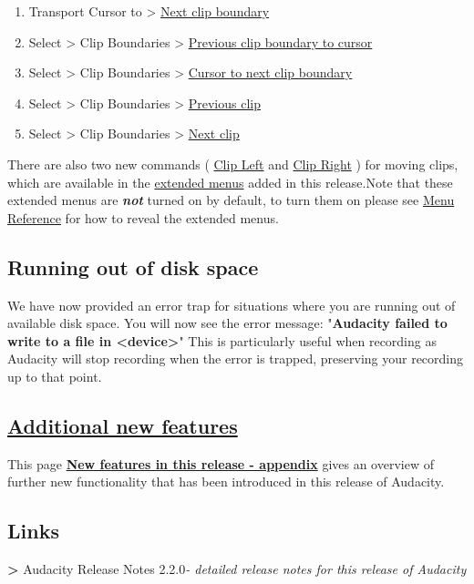 \begin{multicols}{2}
\begin{enumerate}
\item Transport Cursor to > 
\hyperref[\foo{transport:menu:cursor:to:next:clip:boundary}]{Next clip boundary}

\item Select > Clip Boundaries > 
\hyperref[\foo{select:menu:clip:boundaries:previous:clip:boundary:to:cursor}]{Previous clip boundary to cursor}

\item Select > Clip Boundaries > 
\hyperref[\foo{select:menu:clip:boundaries:cursor:to:next:clip:boundary}]{Cursor to next clip boundary}

\item Select > Clip Boundaries > 
\hyperref[\foo{select:menu:clip:boundaries:previous:clip}]{Previous clip}

\item Select > Clip Boundaries > 
\hyperref[\foo{select:menu:clip:boundaries:next:clip}]{Next clip}

\end{enumerate}
There are also two new commands (
\hyperref[\foo{ext:command:menu:cursor:clip:left}]{Clip Left}
 and 
\hyperref[\foo{ext:command:menu:cursor:clip:right}]{Clip Right}
) for moving clips, which are available in the 
\hyperref[\foo{new:features:in:this:release::extendedmenubar}]{extended menus}
 added in this release.Note that these extended menus are \textit{\textbf{not}} turned on by default, to turn them on please see 
\hyperref[\foo{menu:reference:the:extended:menu:bar}]{Menu Reference}
 for how to reveal the extended menus.
\subsection{Running out of disk space}
\label{new:features:in:this:release:safety}We have now provided an error trap for situations where you are running out of available disk space.
You will now see the error message:
"\textbf{Audacity failed to write to a file in <device>}"
This is particularly useful when recording as Audacity will stop recording when the error is trapped, preserving your recording up to that point.

\subsection{
\hyperref[\foo{new:features:in:this:release:appendix:}]{Additional new features}
}
\label{new:features:in:this:release:appendix}This page \textbf{
\hyperref[\foo{new:features:in:this:release:appendix:}]{New features in this release - appendix}
} gives an overview of further new functionality that has been introduced in this release of Audacity.

\subsection{Links}\textbf{>} Audacity Release Notes 2.2.0\textit{- detailed release notes for this release of Audacity}\end{multicols}